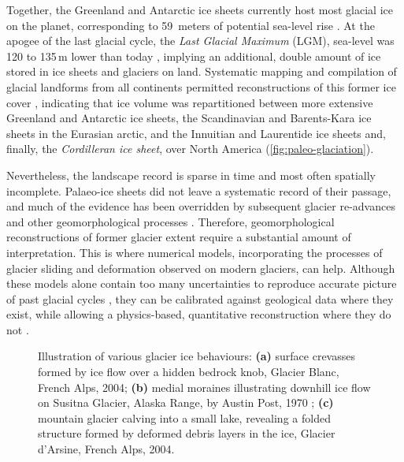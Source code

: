 \documentclass{article}
\newcommand{\subgraphics}[3][,]{%
  \setbox1=\hbox{\texttt{[image: \#3]}}%
  \leavevmode\rlap{\usebox1}%
  \rlap{\hspace*{0.25em}
        \raisebox{\dimexpr\ht1-3ex}{\textbf{(#2)}}}%
  \phantom{\usebox1}%
}
\begin{document}
Together, the Greenland and Antarctic ice sheets currently host most glacial
ice on the planet, corresponding to 59~meters of potential sea-level rise
\citep{Bamber.etal.2001, Fretwell.etal.2013}. At the apogee of the last glacial
cycle, the \emph{Last Glacial Maximum} (LGM), sea-level was 120 to 135\,m lower
than today
\citep{Clark.Mix.2002}, implying an additional, double amount of ice stored in
ice sheets and glaciers on land. Systematic mapping and compilation of glacial
landforms from all continents permitted reconstructions of this former ice
cover \citep{Ehlers.Gibbard.2007}, indicating that ice volume
was repartitioned between more extensive Greenland and Antarctic ice sheets,
the Scandinavian and Barents-Kara ice sheets in the Eurasian arctic, and the
Innuitian and Laurentide ice sheets and, finally, the \emph{Cordilleran ice
sheet}, over North America (\cref{fig:paleo-glaciation}).

Nevertheless, the landscape record is sparse in time and most often spatially
incomplete. Palaeo-ice sheets did not leave a systematic record of their
passage, and much of the evidence has been overridden by subsequent glacier
re-advances and other geomorphological processes \citep{Kleman.1994}.
Therefore, geomorphological reconstructions of former glacier extent require a
substantial amount of interpretation. This is where numerical models,
incorporating the processes of glacier sliding \citep[e.g.,][]{Weertman.1957}
and deformation \citep[e.g.,][]{Nye.1953} observed on modern glaciers, can help.
Although these models alone contain too many uncertainties to reproduce
accurate picture of past glacial cycles \citep[e.g.,][]{Hebeler.etal.2008},
they can be calibrated against geological data where they exist, while
allowing a physics-based, quantitative reconstruction where they do not
\citep[e.g.,][]{Marshall.etal.2002, Tarasov.Peltier.2004}.

\begin{figure}
  \centering
  \makebox[0pt]{
    \subgraphics{a}{photo-glacier-crevasses}
    \hspace{1cm}
    \subgraphics{b}{photo-glacier-susitna}
    \hspace{1cm}
    \subgraphics{c}{photo-glacier-fold}
  }
  \caption{Illustration of various glacier ice behaviours:
           \textbf{(a)} surface crevasses formed by ice flow over a hidden
           bedrock knob, Glacier Blanc, French Alps, 2004;
           \textbf{(b)} medial moraines illustrating downhill ice flow on
           Susitna Glacier, Alaska Range, by Austin Post, 1970
           \citep{NSIDC.2009};
           \textbf{(c)} mountain glacier calving into a small lake, revealing a
           folded structure formed by deformed debris layers in the ice,
           Glacier d'Arsine, French Alps, 2004.}
  \label{fig:glacier-mechanics}
\end{figure}
\end{document}
